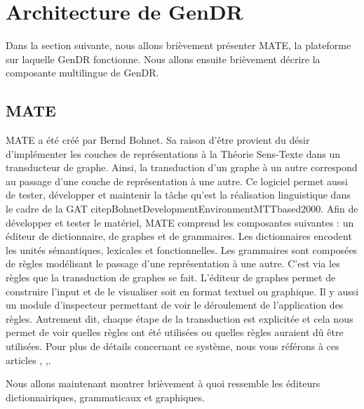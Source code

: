 \section{Architecture de GenDR}

Dans la section suivante, nous allons brièvement présenter MATE, la plateforme sur laquelle GenDR fonctionne. Nous allons ensuite brièvement décrire la composante multilingue de GenDR.

\subsection{MATE}
\citep{Lareau2007TowardsAG}

MATE a été créé par Bernd Bohnet. Sa raison d'être provient du désir d'implémenter les couches de représentations à la Théorie Sens-Texte dans un transducteur de graphe. Ainsi, la transduction d'un graphe à un autre correspond au passage d'une couche de représentation à une autre. Ce logiciel permet aussi de tester, développer et maintenir la tâche qu'est la réalisation linguistique dans le cadre de la \ac{GAT} citep{BohnetDevelopmentEnvironmentMTTbased2000}. Afin de développer et tester le matériel, MATE comprend les composantes suivantes : un éditeur de dictionnaire, de graphes et de grammaires. Les dictionnaires encodent les unités sémantiques, lexicales et fonctionnelles. Les grammaires sont composées de règles modélisant le passage d'une représentation à une autre. C'est via les règles que la transduction de graphes se fait. L'éditeur de graphes permet de construire l'input et de le visualiser soit en format textuel ou graphique. Il y aussi un module d'inspecteur permettant de voir le déroulement de l'application des règles. Autrement dit, chaque étape de la transduction est explicitée et cela nous permet de voir quelles règles ont été utilisées ou quelles règles auraient dû être utilisées. Pour plus de détails concernant ce système, nous vous référons à ces articles \citep{BohnetDevelopmentEnvironmentMTTbased2000}, \citep{BohnetOpensourcegraph2010},\citep{LambreyImplementationcollocationspour2017}.

Nous allons maintenant montrer brièvement à quoi ressemble les éditeurs dictionnairiques, grammaticaux et graphiques.

